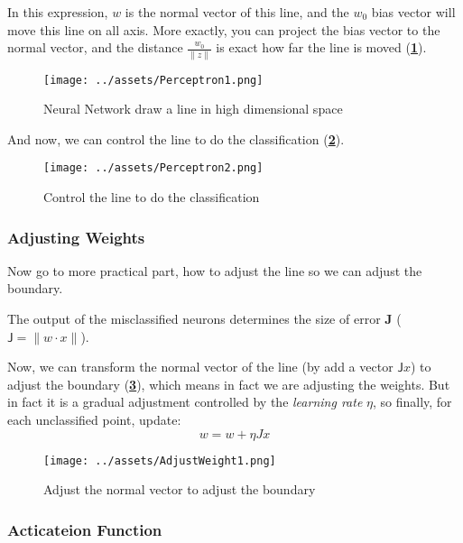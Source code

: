\documentclass[a4paper, openany]{book}
\begin{document}
In this expression, $w$ is the normal vector of this line, and the $w_0$ bias vector will move this line on all axis. More exactly, you can project the bias vector to the normal vector, and the distance $\frac{w_0}{\lVert z \rVert}$ is exact how far the line is moved (\textbf{\cref{fig:PerceptronClassification1}}).

\begin{figure}[htbp]
  \centering
  \texttt{[image: ../assets/Perceptron1.png]}
  \caption{Neural Network draw a line in high dimensional space}
  \label{fig:PerceptronClassification1}
\end{figure}

And now, we can control the line to do the classification (\textbf{\cref{fig:PerceptronClassification2}}).

\begin{figure}[htbp]
  \centering
  \texttt{[image: ../assets/Perceptron2.png]}
  \caption{Control the line to do the classification}
  \label{fig:PerceptronClassification2}
\end{figure}

\subsubsection{Adjusting Weights}

Now go to more practical part, how to adjust the line so we can adjust the boundary.

The output of the misclassified neurons determines the size of error \textbf{J} ($\mathsf{J} = \lVert w \cdot x \rVert$).

Now, we can transform the normal vector of the line (by add a vector $\mathsf{J}x$) to adjust the boundary (\textbf{\cref{fig:AdjustWeight1}}), which means in fact we are adjusting the weights. But in fact it is a gradual adjustment controlled by the \textit{learning rate} $\eta$, so finally, for each unclassified point, update:
$$w = w + \eta J x$$

\begin{figure}[htbp]
  \centering
  \texttt{[image: ../assets/AdjustWeight1.png]}
  \caption{Adjust the normal vector to adjust the boundary}
  \label{fig:AdjustWeight1}
\end{figure}

\subsubsection{Acticateion Function}
\end{document}
